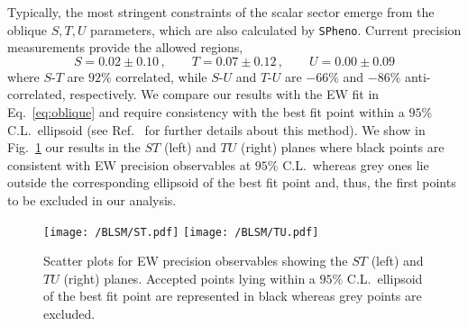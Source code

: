 %
% 
%
Typically, the most stringent constraints of the scalar sector emerge from the oblique $S,T,U$ parameters, which are also calculated by \texttt{SPheno}. Current precision measurements provide the allowed regions,
%
\begin{equation}
	S = 0.02 \pm 0.10\,, \qquad T = 0.07 \pm 0.12\,, \qquad U = 0.00 \pm 0.09
	\label{eq:oblique}
\end{equation}
%
where $S$-$T$ are $92\%$ correlated, while $S$-$U$ and $T$-$U$ are $-66\%$ and $-86\%$ anti-correlated, respectively.
%
We compare our results with the EW fit in Eq.~\eqref{eq:oblique} and require consistency with the best fit point within a $95\%$ C.L.~ellipsoid (see Ref.~\cite{Costa:2014qga} for further details about this method). We show in Fig.~\ref{fig:STU} our results in the $ST$ (left) and $TU$ (right) planes where black points are consistent with EW precision observables at $95\%$ C.L.~whereas grey ones lie outside the corresponding ellipsoid of the best fit point and, thus, the first points to be excluded in our analysis. 
\begin{figure}[H]
	\centering
	\texttt{[image: /BLSM/ST.pdf]}
	\texttt{[image: /BLSM/TU.pdf]}
	\caption{Scatter plots for EW precision observables showing the $ST$ (left) and $TU$ (right) planes. Accepted points lying within a $95\%$ C.L.~ellipsoid of the best fit point are represented in black whereas grey points are excluded.}
	\label{fig:STU}
\end{figure}	


